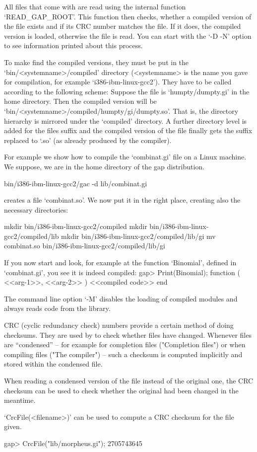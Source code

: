 All files that come with {\GAP} are read using the internal function
`READ_GAP_ROOT'. This function then checks, whether a compiled version of the
file exists and if its CRC number matches the file. If it does, the compiled
version is loaded, otherwise the file is read.
You can start {\GAP} with the `-D -N' option to see information printed
about this process.

To make {\GAP} find the compiled versions, they must be
put in the `bin/<systemname>/compiled' directory (<systemname> is the name
you gave for compilation, for example `i386-ibm-linux-gcc2'). They have
to be called according to the following scheme: 
Suppose the file is `humpty/dumpty.gi' in the {\GAP} home
directory. Then the compiled version will be
`bin/<systemname>/compiled/humpty/gi/dumpty.so'. That is, the directory
hierarchy is mirrored under the `compiled' directory. A further directory
level is added for the files suffix and the compiled version of the file
finally gets the suffix replaced to `.so' (as already produced by the
compiler).

For example we show how
to compile the `combinat.gi' file on a Linux machine. We suppose, we are in
the home directory of the gap distribution.

\begintt
bin/i386-ibm-linux-gcc2/gac -d lib/combinat.gi
\endtt

creates a file `combinat.so'. We now put it in the right place, creating
also the necessary directories:

\begintt
mkdir bin/i386-ibm-linux-gcc2/compiled
mkdir bin/i386-ibm-linux-gcc2/compiled/lib
mkdir bin/i386-ibm-linux-gcc2/compiled/lib/gi
mv combinat.so bin/i386-ibm-linux-gcc2/compiled/lib/gi
\endtt

If you now start {\GAP} and look, for example at the function `Binomial',
defined in `combinat.gi', you see it is indeed compiled:
\begintt
gap> Print(Binomial);
function ( <<arg-1>>, <<arg-2>> )
    <<compiled code>>
end
\endtt

The command line option `-M'  disables the loading of compiled modules and
always reads code from the library.


CRC (cyclic redundancy check) numbers provide a certain method of doing
checksums. They are used by {\GAP} to check whether
files have changed.
Whenever files are ``condensed'' -- for example for completion files
("Completion files") or when compiling files ("The compiler") -- such a
checksum is computed implicitly and stored within the condensed file.

When reading a condensed version of the file instead of the original one,
the CRC checksum can be used to check whether the original had been changed
in the meantime.

`CrcFile(<filename>)' can be used to compute a CRC checksum for the file
given.

\begintt
gap> CrcFile("lib/morpheus.gi");
2705743645
\endtt

